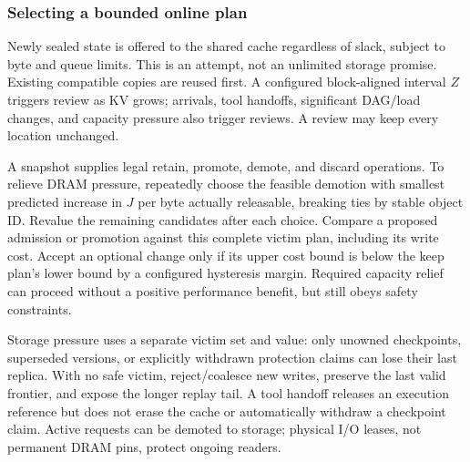 \subsubsection{Selecting a bounded online plan}
\label{sec:placement-plan}
Newly sealed state is offered to the shared cache regardless of slack,
subject to byte and queue limits. This is an attempt, not an unlimited
storage promise. Existing compatible copies are reused first. A configured
block-aligned interval $Z$ triggers review as KV grows; arrivals, tool
handoffs, significant DAG/load changes, and capacity pressure also trigger
reviews. A review may keep every location unchanged.

A snapshot supplies legal retain, promote, demote, and discard operations.
To relieve DRAM pressure, repeatedly choose the feasible demotion with
smallest predicted increase in $J$ per byte actually releasable, breaking
ties by stable object ID. Revalue the remaining candidates after each
choice. Compare a proposed admission or promotion against this complete
victim plan, including its write cost. Accept an optional change only if
its upper cost bound is below the keep plan's lower bound by a configured
hysteresis margin. Required capacity relief can proceed without a positive
performance benefit, but still obeys safety constraints.

Storage pressure uses a separate victim set and value: only unowned
checkpoints, superseded versions, or explicitly withdrawn protection
claims can lose their last replica. With no safe victim, reject/coalesce
new writes, preserve the last valid frontier, and expose the longer replay
tail. A tool handoff releases an execution reference but does not erase
the cache or automatically withdraw a checkpoint claim. Active requests
can be demoted to storage; physical I/O leases, not permanent DRAM pins,
protect ongoing readers.

